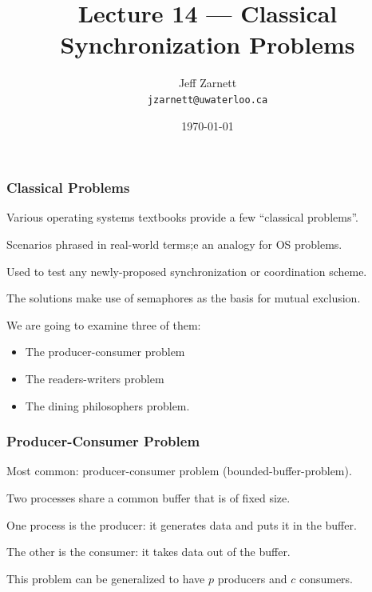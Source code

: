 

\title{Lecture 14 --- Classical Synchronization Problems }

\author{Jeff Zarnett \\ \small \texttt{jzarnett@uwaterloo.ca}}
\date{\today}




\begin{frame}
  \titlepage

 \end{frame}

\begin{frame}
\frametitle{Classical Problems}

Various operating systems textbooks provide a few ``classical problems''. 

Scenarios phrased in real-world terms;e an analogy for OS problems. 

Used to test any newly-proposed synchronization or coordination scheme.

 The solutions make use of semaphores as the basis for mutual exclusion. 
 
 We are going to examine three of them: 
 \begin{itemize}
 \item The producer-consumer problem 
 \item The readers-writers problem 
 \item The dining philosophers problem.
 \end{itemize}


\end{frame}


\begin{frame}
\frametitle{Producer-Consumer Problem}

Most common: producer-consumer problem (bounded-buffer-problem). 

Two processes share a common buffer that is of fixed size. 

One process is the producer: it generates data and puts it in the buffer.

The other is the consumer: it takes data out of the buffer. 

This problem can be generalized to have $p$ producers and $c$ consumers.

\end{frame}




